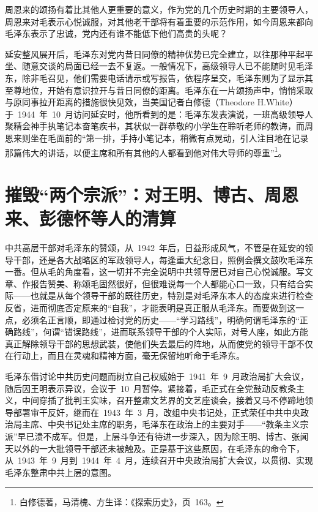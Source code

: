 周恩来的颂扬有着比其他人更重要的意义，作为党的几个历史时期的主要领导人，周恩来对毛表示心悦诚服，对其他老干部将有着重要的示范作用，如今周恩来都向毛泽东表示了忠诚，党内还有谁不能低下他们高贵的头呢？

延安整风展开后，毛泽东对党内昔日同僚的精神优势已完全建立，以往那种平起平坐、随意交谈的局面已经一去不复返。一般情况下，高级领导人已不能随时见毛泽东，除非毛召见，他们需要电话请示或写报告，依程序呈交，毛泽东则为了显示其至尊地位，开始有意识拉开与昔日同僚的距离。毛泽东在一片颂扬声中，悄悄采取与原同事拉开距离的措施很快见效，当美国记者白修德（Theodore H.White）于~1944~年~10~月访问延安时，他所看到的是：毛泽东发表演说，一班高级领导人聚精会神手执笔记本奋笔疾书，其状似一群恭敬的小学生在聆听老师的教诲，而周恩来则坐在毛面前的“第一排，手持小笔记本，稍微有点晃动，引人注目地在记录那篇伟大的讲话，以便主席和所有其他的人都看到他对伟大导师的尊重”\footnote{白修德著，马清槐、方生译：《探索历史》，页~163。}。

\section{摧毁“两个宗派”：对王明、博古、周恩来、彭德怀等人的清算}

中共高层干部对毛泽东的赞颂，从~1942~年后，日益形成风气，不管是在延安的领导干部，还是各大战略区的军政领导人，每逢重大纪念日，照例会撰文鼓吹毛泽东一番。但从毛的角度看，这一切并不完全说明中共领导层已对自己心悦诚服。写文章、作报告赞美、称颂毛固然很好，但很难说每一个人都能心口一致，只有结合实际——也就是从每个领导干部的既往历史，特别是对毛泽东本人的态度来进行检查反省，进而彻底否定原来的“自我”，才能表明是真正服从毛泽东。而要做到这一点，必须名正言顺，即通过检讨党的历史——“学习路线”，明确何谓毛泽东的“正确路线”，何谓“错误路线”，进而联系领导干部的个人实际，对号人座，如此方能真正解除领导干部的思想武装，使他们失去最后的阵地，从而使党的领导干部不仅在行动上，而且在灵魂和精神方面，毫无保留地听命于毛泽东。

毛泽东借讨论中共历史问题而树立自己权威始于~1941~年~9~月政治局扩大会议，随后因王明表示异议，会议于~10~月暂停。紧接着，毛正式在全党鼓动反教条主义，中间穿插了批判王实味，召开整肃文艺界的文艺座谈会，接着又马不停蹄地领导部署审干反奸，继而在~1943~年~3~月，改组中央书记处，正式荣任中共中央政治局主席、中央书记处主席的职务，毛泽东在政治上的主要对手——“教条主义宗派”早已溃不成军。但是，上层斗争还有待进一步深入，因为除王明、博古、张闻天以外的一大批领导干部还未被触及。正是基于这些原因，在毛泽东的命令下，从~1943~年~9~月到~1944~年~4~月，连续召开中央政治局扩大会议，以贯彻、实现毛泽东整肃中共上层的意图。

